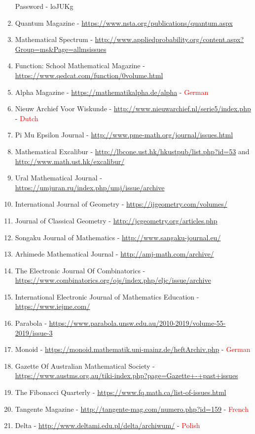 \documentclass{article}
\begin{document}
\begin{enumerate}
Password - loJUKg
\item Quantum Magazine - \url{https://www.nsta.org/publications/quantum.aspx}
\item Mathematical Spectrum - \url{http://www.appliedprobability.org/content.aspx?Group=ms&Page=allmsissues}
\item Function: School Mathematical Magazine - \url{https://www.qedcat.com/function/0volume.html}
\item Alpha Magazine - \url {https://mathematikalpha.de/alpha} - \textcolor{Red}{German}
\item Nieuw Archief Voor Wiskunde - \url {http://www.nieuwarchief.nl/serie5/index.php} - \textcolor{Red}{Dutch}
\item Pi Mu Epsilon Journal - \url{http://www.pme-math.org/journal/issues.html}
\item Mathematical Excalibur - \url {http://lbcone.ust.hk/hkustpub/list.php?id=53} and \url{http://www.math.ust.hk/excalibur/}
\item Ural Mathematical Journal - \url{https://umjuran.ru/index.php/umj/issue/archive}
\item International Journal of Geometry - \url{https://ijgeometry.com/volumes/}
\item Journal of Classical Geometry - \url{http://jcgeometry.org/articles.php}
\item Songaku Journal of Mathematics - \url{http://www.sangaku-journal.eu/}
\item Arhimede Mathematical Journal - \url{http://amj-math.com/archive/}
\item The Electronic Journal Of Combinatorics - \url{https://www.combinatorics.org/ojs/index.php/eljc/issue/archive}
\item International Electronic Journal of Mathematics Education - \url{https://www.iejme.com/}
\item Parabola - \url{https://www.parabola.unsw.edu.au/2010-2019/volume-55-2019/issue-3}
\item Monoid - \url {https://monoid.mathematik.uni-mainz.de/heftArchiv.php} - \textcolor{Red}{German}
\item Gazette Of Australian Mathematical Society -\url{https://www.austms.org.au/tiki-index.php?page=Gazette+-+past+issues}
\item The Fibonacci Quarterly - \url{https://www.fq.math.ca/list-of-issues.html}
\item Tangente Magazine - \url {http://tangente-mag.com/numero.php?id=159} - \textcolor{Red}{French}
\item Delta - \url {http://www.deltami.edu.pl/delta/archiwum/} - \textcolor{Red}{Polish}

\end{enumerate}
\end{document}
